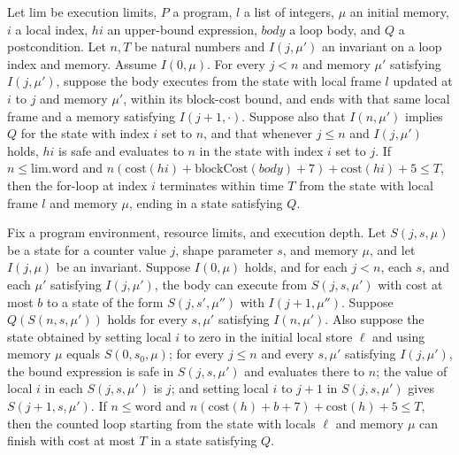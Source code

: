 \begin{theorem}
\label{Light.Ends.forFrame}
\leanok
{}
Let $\mathrm{lim}$ be execution limits, $P$ a program, $l$ a list of integers, $\mu$ an
initial memory, $i$ a local index, $hi$ an upper-bound expression, $body$ a loop body, and
$Q$ a postcondition. Let $n,T$ be natural numbers and $I(j,\mu\prime)$ an invariant on
a loop index and memory. Assume $I(0,\mu)$. For every $j<n$ and memory $\mu\prime$
satisfying $I(j,\mu\prime)$, suppose the body executes from the state with local frame
$l$ updated at $i$ to $j$ and memory $\mu\prime$, within its block-cost bound, and
ends with that same local frame and a memory satisfying $I(j+1,\cdot)$. Suppose also
that $I(n,\mu\prime)$ implies $Q$ for the state with index $i$ set to $n$, and that
whenever $j\le n$ and $I(j,\mu\prime)$ holds, $hi$ is safe and evaluates to $n$ in
the state with index $i$ set to $j$. If $n\le\mathrm{lim.word}$ and
$n(\mathrm{cost}(hi)+\mathrm{blockCost}(body)+7)+\mathrm{cost}(hi)+5\le T$, then the
for-loop at index $i$ terminates within time $T$ from the state with local frame $l$
and memory $\mu$, ending in a state satisfying $Q$.
\end{theorem}

\begin{theorem}
\label{Light.Ends.forShape}
\leanok
{}
Fix a program environment, resource limits, and execution depth. Let $S(j,s,\mu)$ be a
state for a counter value $j$, shape parameter $s$, and memory $\mu$, and let $I(j,\mu)$
be an invariant. Suppose $I(0,\mu)$ holds, and for each $j<n$, each $s$, and each $\mu'$
satisfying $I(j,\mu')$, the body can execute from $S(j,s,\mu')$ with cost at most $b$ to
a state of the form $S(j,s',\mu'')$ with $I(j+1,\mu'')$. Suppose $Q(S(n,s,\mu'))$ holds
for every $s,\mu'$ satisfying $I(n,\mu')$. Also suppose the state obtained by setting
local $i$ to zero in the initial local store $\ell$ and using memory $\mu$ equals
$S(0,s_0,\mu)$; for every $j\le n$ and every $s,\mu'$ satisfying $I(j,\mu')$, the bound
expression is safe in $S(j,s,\mu')$ and evaluates there to $n$; the value of local $i$
in each $S(j,s,\mu')$ is $j$; and setting local $i$ to $j+1$ in $S(j,s,\mu')$ gives
$S(j+1,s,\mu')$. If $n\le\mathrm{word}$ and
$n(\mathrm{cost}(h)+b+7)+\mathrm{cost}(h)+5\le T$, then the counted loop starting from
the state with locals $\ell$ and memory $\mu$ can finish with cost at most $T$ in a
state satisfying $Q$.
\end{theorem}

